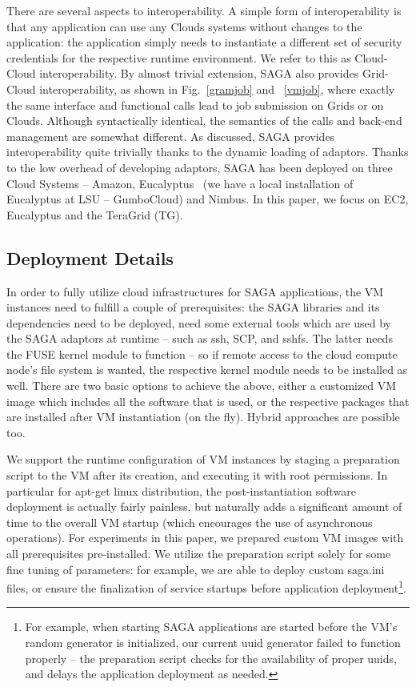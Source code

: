 \documentclass[conference,final]{IEEEtran}
\newcommand{\upup}{\vspace*{-0.6em}}
\begin{document}
There are several aspects to interoperability. A simple form of
interoperability is that any application can use any Clouds systems
without changes to the application: the application simply needs to
instantiate a different set of security credentials for the respective
runtime environment. We refer to this as Cloud-Cloud
interoperability. By almost trivial extension, SAGA also provides
Grid-Cloud interoperability, as shown in Fig.~\ref{gramjob} and
~\ref{vmjob}, where exactly the same interface and functional calls
lead to job submission on Grids or on Clouds. Although syntactically
identical, the semantics of the calls and back-end management are
somewhat different.  As discussed, SAGA provides interoperability
quite trivially thanks to the dynamic loading of adaptors.  Thanks to
the low overhead of developing adaptors, SAGA has been deployed on
three Cloud Systems -- Amazon, Eucalyptus~\cite{eucalyptus} (we have a
local installation of Eucalyptus at LSU -- GumboCloud) and
Nimbus.  In this paper, we focus on EC2, Eucalyptus and the TeraGrid
(TG).

\upup
\subsection{Deployment Details}

In order to fully utilize cloud infrastructures for SAGA applications,
the VM instances need to fulfill a couple of prerequisites: the SAGA
libraries and its dependencies need to be deployed, need some external
tools which are used by the SAGA adaptors at runtime -- such as ssh,
SCP, and sshfs.  The latter needs the FUSE kernel module to function
-- so if remote access to the cloud compute node's file system is
wanted, the respective kernel module needs to be installed as well.
There are two basic options to achieve the above, either a customized
VM image which includes all the software that is used, or the
respective packages that are installed after VM instantiation (on the
fly).  Hybrid approaches are possible too.

We support the runtime configuration of VM instances by staging a
preparation script to the VM after its creation, and executing it with
root permissions.  In particular for apt-get linux distribution, the
post-instantiation software deployment is actually fairly painless,
but naturally adds a significant amount of time to the overall VM
startup (which encourages the use of asynchronous operations).
For experiments in this paper, we prepared custom VM images with all
prerequisites pre-installed.  We utilize the preparation script solely
for some fine tuning of parameters: for example, we are able to deploy
custom saga.ini files, or ensure the finalization of service startups
before application deployment\footnote{For example, when starting SAGA
  applications are started before the VM's random generator is
  initialized, our current uuid generator failed to function properly
  -- the preparation script checks for the availability of proper
  uuids, and delays the application deployment as needed.}.
\end{document}
